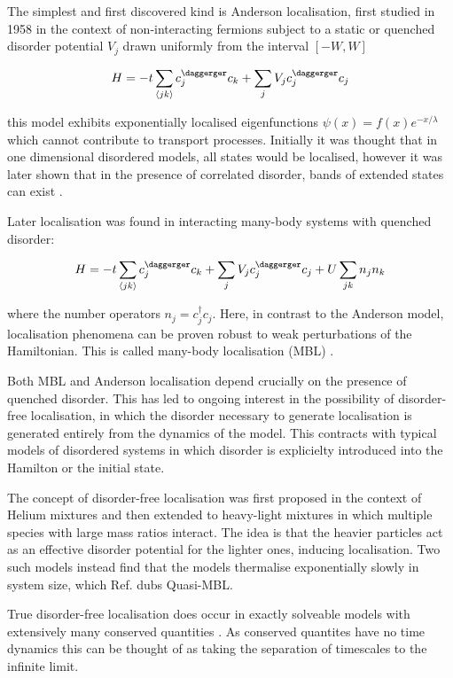 The simplest and first discovered kind is Anderson localisation, first studied in 1958 \textcite{anderson_absence_1958-1} in the context of non-interacting fermions subject to a static or quenched disorder potential \(V_j\) drawn uniformly from the interval \([-W,W]\)

\[
H = -t\sum_{\langle jk \rangle} c^\daggerger_j c_k + \sum_j V_j c_j^\daggerger c_j
\]

this model exhibits exponentially localised eigenfunctions \(\psi(x) = f(x) e^{-x/\lambda}\) which cannot contribute to transport processes. Initially it was thought that in one dimensional disordered models, all states would be localised, however it was later shown that in the presence of correlated disorder, bands of extended states can exist \autocite{izrailev_localization_1999,croy_anderson_2011,izrailev_anomalous_2012}.

Later localisation was found in interacting many-body systems with quenched disorder:

\[
H = -t\sum_{\langle jk \rangle} c^\daggerger_j c_k + \sum_j V_j c_j^\daggerger c_j + U\sum_{jk} n_j n_k
\]

where the number operators \(n_j = c^\dagger_j c_j\). Here, in contrast to the Anderson model, localisation phenomena can be proven robust to weak perturbations of the Hamiltonian. This is called many-body localisation (MBL) \textcite{imbrie_many-body_2016}.

Both MBL and Anderson localisation depend crucially on the presence of quenched disorder. This has led to ongoing interest in the possibility of disorder-free localisation, in which the disorder necessary to generate localisation is generated entirely from the dynamics of the model. This contracts with typical models of disordered systems in which disorder is explicielty introduced into the Hamilton or the initial state.

The concept of disorder-free localisation was first proposed in the context of Helium mixtures \textcite{kagan1984localization} and then extended to heavy-light mixtures in which multiple species with large mass ratios interact. The idea is that the heavier particles act as an effective disorder potential for the lighter ones, inducing localisation. Two such models \autocite{yao_quasi-many-body_2016,schiulaz_dynamics_2015} instead find that the models thermalise exponentially slowly in system size, which Ref. \textcite{yao_quasi-many-body_2016} dubs Quasi-MBL.

True disorder-free localisation does occur in exactly solveable models with extensively many conserved quantities \textcite{smith_disorder-free_2017}. As conserved quantites have no time dynamics this can be thought of as taking the separation of timescales to the infinite limit.

